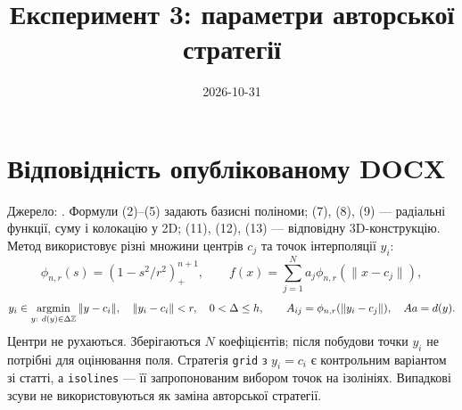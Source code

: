 \documentclass[11pt,a4paper]{article}
\begin{document}
\title{Експеримент 3: параметри авторської стратегії}\author{}\date{2026-10-31}\maketitle

\section*{Відповідність опублікованому DOCX}
Джерело: .
Формули (2)--(5) задають базисні поліноми; (7), (8), (9) ---
радіальні функції, суму і колокацію у 2D; (11), (12), (13) --- відповідну
3D-конструкцію. Метод використовує різні множини центрів $c_j$
та точок інтерполяції $y_i$:
\[
 \phi_{n,r}(s)=(1-s^2/r^2)_+^{n+1},\qquad
 f(x)=\sum_{j=1}^N a_j\phi_{n,r}(\|x-c_j\|),
\]
\[
 y_i\in\mathop{\rm argmin}_{y:\ d(y)\in\Delta\mathbb Z}\|y-c_i\|,
 \quad \|y_i-c_i\|<r,\quad 0<\Delta\le h,
 \qquad A_{ij}=\phi_{n,r}(\|y_i-c_j\|),\quad Aa=d(y).
\]
Центри не рухаються. Зберігаються $N$ коефіцієнтів; після побудови
точки $y_i$ не потрібні для оцінювання поля.
Стратегія \texttt{grid} з $y_i=c_i$ є контрольним варіантом зі статті,
а \texttt{isolines} --- її запропонованим вибором точок на ізолініях.
Випадкові зсуви не використовуються як заміна авторської стратегії.
\end{document}
